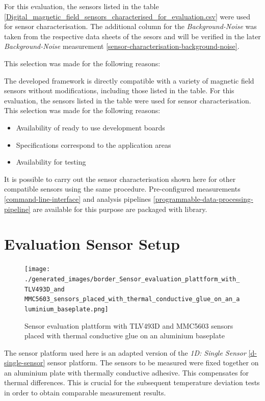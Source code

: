 For this evaluation, the sensors listed in the table
\ref{Digital_magnetic_field_sensors_characterised_for_evaluation.csv}
were used for sensor characterisation. The additional column for the
\emph{Background-Noise} was taken from the respective data sheets of the
sesors and will be verified in the later \emph{Background-Noise}
measurement \ref{sensor-characterisation-background-noise}.

This selection was made for the following reasons:

The developed framework is directly compatible with a variety of
magnetic field sensors without modifications, including those listed in
the table. For this evaluation, the sensors listed in the table were
used for sensor characterisation. This selection was made for the
following reasons:

\begin{itemize}
\tightlist
\item
  Availability of ready to use development boards
\item
  Specifications correspond to the application areas
\item
  Availability for testing
\end{itemize}

It is possible to carry out the sensor characterisation shown here for
other compatible sensors using the same procedure. Pre-configured
measurements \ref{command-line-interface} and analysis pipelines
\ref{programmable-data-processing-pipeline} are available for this
purpose are packaged with library.

\hypertarget{evaluation-sensor-setup}{%
\section{Evaluation Sensor Setup}\label{evaluation-sensor-setup}}

\begin{figure}
\centering
\texttt{[image: ./generated\_images/border\_Sensor\_evaluation\_plattform\_with\_TLV493D\_and MMC5603\_sensors\_placed\_with\_thermal\_conductive\_glue\_on\_an\_aluminium\_baseplate.png]}
\caption{Sensor evaluation plattform with TLV493D and MMC5603 sensors
placed with thermal conductive glue on an aluminium baseplate
\label{Sensor_evaluation_plattform_with_TLV493D_and MMC5603_sensors_placed_with_thermal_conductive_glue_on_an_aluminium_baseplate.png}}
\end{figure}

The sensor platform used here is an adapted version of the \emph{1D:
Single Sensor} \ref{d-single-sensor} sensor platform. The sensors to be
measured were fixed together on an aluminium plate with thermally
conductive adhesive. This compensates for thermal differences. This is
crucial for the subsequent temperature deviation tests in order to
obtain comparable measurement results.

